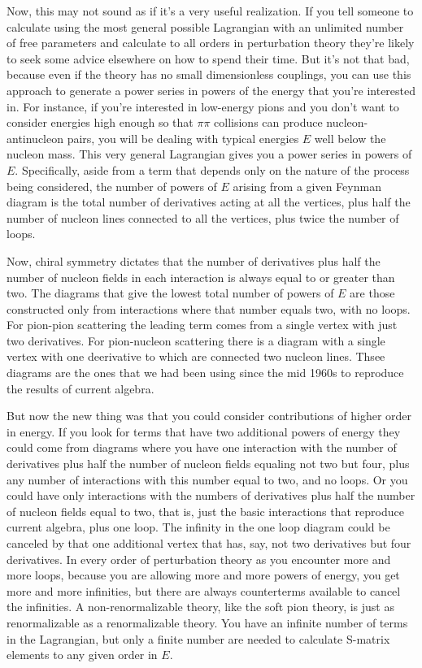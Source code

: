 Now, this may not sound as if it's a very useful realization.  If you tell someone to calculate using the most general possible Lagrangian with an unlimited number of free parameters and calculate to all orders in perturbation theory they're likely to seek some advice elsewhere on how to spend their time. But it's not that bad, because even if the theory has no small dimensionless couplings, you can use this approach to generate a power series in powers of the energy that you're interested in. For instance, if you're interested in low-energy pions and you don't want to consider energies high enough so that  $\pi\pi$ collisions can produce nucleon-antinucleon pairs, you will be dealing with typical energies $E$  well below the nucleon mass. This very general Lagrangian gives you a power series in powers of $E$.  Specifically, aside from a term that depends only on the nature of the process being considered, the number of powers of $E$ arising from a given Feynman diagram is the total number of derivatives acting at all the vertices, plus half the number of nucleon lines connected to all the vertices, plus twice the number of loops.  

Now, chiral symmetry dictates that the number of derivatives plus half the number of nucleon fields in each interaction is always equal to or greater than two. The diagrams that give the lowest total number of powers of $E$ are those constructed only from  interactions where that number equals two, with no loops.  For pion-pion scattering the leading term comes from a single vertex with just two derivatives.  For pion-nucleon scattering there is a diagram with  a single vertex with one deerivative to which are connected two nucleon lines.  Thsee diagrams  are the ones that we had  been using since the mid 1960s to reproduce the results of current algebra.

But now the new thing was that you could consider contributions of higher order in energy. If you look for terms that have two additional powers of energy they could come from diagrams where you have one interaction with the number of derivatives plus half the number of nucleon fields equaling not two but four, plus any number of interactions with this number equal to two, and no loops. 
Or you could have only interactions with the numbers of derivatives plus half the number of nucleon fields equal to two, that is, just the basic interactions that reproduce current algebra, plus one loop.  The infinity in the one loop diagram could be canceled by that one additional vertex that has, say, not two derivatives but four derivatives. In every order of perturbation theory as you encounter more and more loops, because you are allowing more and more powers of energy, you get more and more infinities, but there are always counterterms available to cancel the infinities. A non-renormalizable theory, like the soft pion theory, is just as renormalizable as a renormalizable theory.  You have an infinite number of terms in the Lagrangian, but only a finite number are needed to calculate S-matrix elements to any  given order in $E$.

